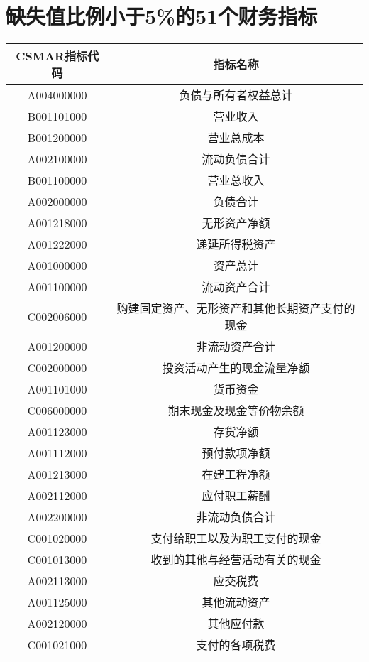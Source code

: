 \chapter{缺失值比例小于5\%的51个财务指标}\label{missing}
\begin{longtable}{cc}
\toprule
CSMAR指标代码    & 指标名称         \\\midrule
\endhead
\bottomrule
\endfoot
A004000000 & 负债与所有者权益总计              \\
B001101000 & 营业收入                    \\
B001200000 & 营业总成本                   \\
A002100000 & 流动负债合计                  \\
B001100000 & 营业总收入                   \\
A002000000 & 负债合计                    \\
A001218000 & 无形资产净额                  \\
A001222000 & 递延所得税资产                 \\
A001000000 & 资产总计                    \\
A001100000 & 流动资产合计                  \\
C002006000 & 购建固定资产、无形资产和其他长期资产支付的现金 \\
A001200000 & 非流动资产合计                 \\
C002000000 & 投资活动产生的现金流量净额           \\
A001101000 & 货币资金                    \\
C006000000 & 期末现金及现金等价物余额            \\
A001123000 & 存货净额                    \\
A001112000 & 预付款项净额                  \\
A001213000 & 在建工程净额                  \\
A002112000 & 应付职工薪酬                  \\
A002200000 & 非流动负债合计                 \\
C001020000 & 支付给职工以及为职工支付的现金         \\
C001013000 & 收到的其他与经营活动有关的现金         \\
A002113000 & 应交税费                    \\
A001125000 & 其他流动资产                  \\
A002120000 & 其他应付款                   \\
C001021000 & 支付的各项税费                 \\

\end{longtable}
